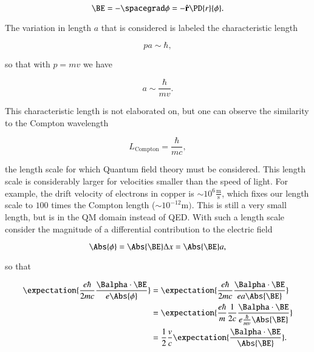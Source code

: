 \begin{equation}\label{eqn:diracGauge:520}
\BE = - \spacegrad \phi = - \rcap \PD{r}{\phi}.
\end{equation}

The variation in length $a$ that is considered is labeled the characteristic length

\begin{equation}\label{eqn:diracGauge:540}
p a \sim \hbar,
\end{equation}

so that with $p = m v$ we have

\begin{equation}\label{eqn:diracGauge:560}
a \sim \frac{\hbar}{m v}.
\end{equation}

This characteristic length is not elaborated on, but one can observe the similarity to the Compton wavelength

\begin{equation}\label{eqn:diracGauge:580}
L_{\text{Compton}} = \frac{\hbar}{m c},
\end{equation}

the length scale for which Quantum field theory must be considered.  This length scale is considerably larger for velocities smaller than the speed of light.  For example, the drift velocity of electrons in copper is $\sim 10^{6} \frac{\text{m}}{\text{s}}$, which fixes our length scale to $100$ times the Compton length ($\sim 10^{-12} \text{m})$.  This is still a very small length, but is in the QM domain instead of QED.  With such a length scale consider the magnitude of a differential contribution to the electric field

\begin{equation}\label{eqn:diracGauge:600}
\Abs{\phi} = \Abs{\BE} \Delta x = \Abs{\BE} a,
\end{equation}

so that

\begin{align*}
\expectation{ \frac{e \hbar}{ 2 m c} \frac{\Balpha \cdot \BE}{e \Abs{\phi} } }
&=
\expectation{ \frac{e \hbar}{ 2 m c} \frac{\Balpha \cdot \BE}{e a \Abs{\BE} } } \\
&=
\expectation{ \frac{e \hbar}{m} \frac{1}{ 2 c} \frac{\Balpha \cdot \BE}{e \frac{\hbar }{ m v } \Abs{\BE} } } \\
&=
\inv{2} \frac{v}{c} \expectation{ \frac{\Balpha \cdot \BE}{ \Abs{\BE} } }.
\end{align*}

